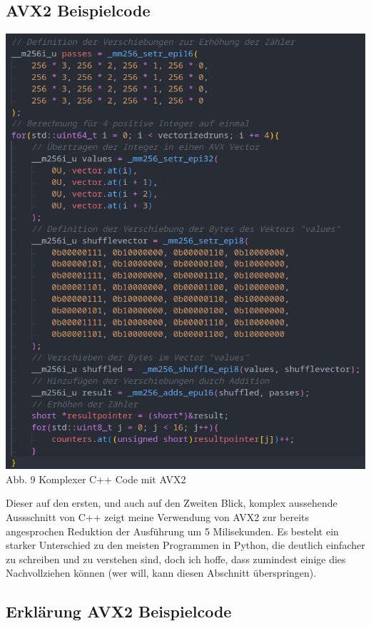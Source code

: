 \documentclass[12pt,a4paper]{article}
\begin{document}
\subsection{AVX2 Beispielcode}

\begin{center}
    \includegraphics[width=1\textwidth]{./diagramme/bilder/avxcode.png}
    Abb. 9 Komplexer C++ Code mit AVX2
\end{center}

\clearpage

Dieser auf den ersten, und auch auf den Zweiten Blick, komplex aussehende Aussschnitt von C++
zeigt meine Verwendung von AVX2 zur bereits angesprochen Reduktion der Ausführung um 5 Milisekunden.
Es besteht ein starker Unterschied zu den meisten Programmen in Python, die deutlich einfacher
zu schreiben und zu verstehen sind, doch ich hoffe, dass zumindest einige dies Nachvollziehen können 
(wer will, kann diesen Abschnitt überspringen).

\subsection{Erklärung AVX2 Beispielcode}
\end{document}
